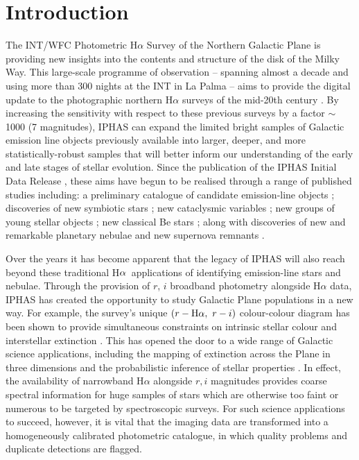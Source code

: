\documentclass[useAMS,usenatbib]{mn2e}
\def\ha{\mbox{H$\rm \alpha$}}
\begin{document}
\section{Introduction}
The INT/WFC Photometric H$\alpha$ Survey
of the Northern Galactic Plane \citep[IPHAS;][]{Drew2005}
is providing new insights into the contents and structure of the disk of the Milky Way.
This large-scale programme of observation
-- spanning almost a decade 
and using more than 300 nights 
at the INT in La Palma --
aims to provide the digital update 
to the photographic northern H$\alpha$ surveys 
of the mid-20th century \citep[see][]{Kohoutek1999}. 
By increasing the sensitivity 
with respect to these previous surveys 
by a factor $\sim$1000 (7 magnitudes), 
IPHAS can expand
the limited bright samples of Galactic emission line objects 
previously available into larger, deeper, and more statistically-robust samples that will 
better inform our understanding 
of the early and late stages of stellar evolution.
Since the publication of the IPHAS Initial Data Release \citep[IDR;][]{Gonzalez-Solares2008},
these aims have begun to be realised through a
range of published studies including: 
a preliminary catalogue of candidate emission-line objects \citep{Witham2008};
discoveries of new symbiotic stars \citep{Corradi2008, Corradi2010, Corradi2011}; 
new cataclysmic variables \citep{Witham2007}; 
new groups of young stellar objects
\citep{Vink2008,Barentsen2011a,Wright2012};
new classical Be stars \citep{Raddi2013};
along with discoveries of new and remarkable planetary nebulae 
\citep{Mampaso2006, Viironen2009a, Viironen2009b, Corradi2011, Viironen2011}
and new supernova remnants \citep{Sabin2013}.

Over the years it has become apparent that the legacy of IPHAS 
will also reach beyond these traditional \ha\ applications 
of identifying emission-line stars and nebulae. 
Through the provision of $r$, $i$ broadband photometry 
alongside H$\alpha$ data,
IPHAS has created the opportunity 
to study Galactic Plane populations 
in a new way.
For example, the survey’s unique $(r-\ha,\ r-i)$ colour-colour
diagram has been shown to provide simultaneous constraints 
on intrinsic stellar colour and interstellar extinction \citep{Drew2008}. 
This has opened the door 
to a wide range of Galactic science applications, 
including the mapping of extinction across the Plane in three dimensions
and the probabilistic inference of stellar properties
\citep{Sale2009, Sale2010, Giammanco2011, Sale2012, Barentsen2013}. 
In effect, the availability of narrowband H$\alpha$ 
alongside $r, i$ magnitudes
provides coarse spectral information for huge samples of stars 
which are otherwise too faint or numerous 
to be targeted by spectroscopic surveys.
For such science applications to succeed, however, 
it is vital that the imaging data are transformed 
into a homogeneously calibrated photometric catalogue, 
in which quality problems 
and duplicate detections are flagged. 
\end{document}

